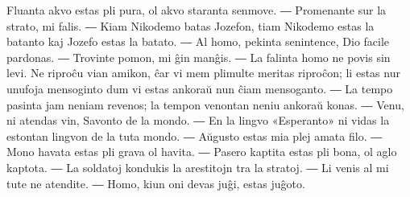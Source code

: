 
Fluanta akvo estas pli pura, ol akvo staranta senmove. ― Promenante sur la strato, mi falis. ― Kiam Nikodemo batas Jozefon, tiam Nikodemo estas la batanto kaj Jozefo estas la batato. ― Al homo, pekinta senintence, Dio facile pardonas. ― Trovinte pomon, mi ĝin manĝis. ― La falinta homo ne povis sin levi. Ne riproĉu vian amikon, ĉar vi mem plimulte meritas riproĉon; li estas nur unufoja mensoginto dum vi estas ankoraŭ nun ĉiam mensoganto. ― La tempo pasinta jam neniam revenos; la tempon venontan neniu ankoraŭ konas. ― Venu, ni atendas vin, Savonto de la mondo. ― En la lingvo «Esperanto» ni vidas la estontan lingvon de la tuta mondo. ― Aŭgusto estas mia plej amata filo. ― Mono havata estas pli grava ol havita. ― Pasero kaptita estas pli bona, ol aglo kaptota. ― La soldatoj kondukis la arestitojn tra la stratoj. ― Li venis al mi tute ne atendite. ― Homo, kiun oni devas juĝi, estas juĝoto.

